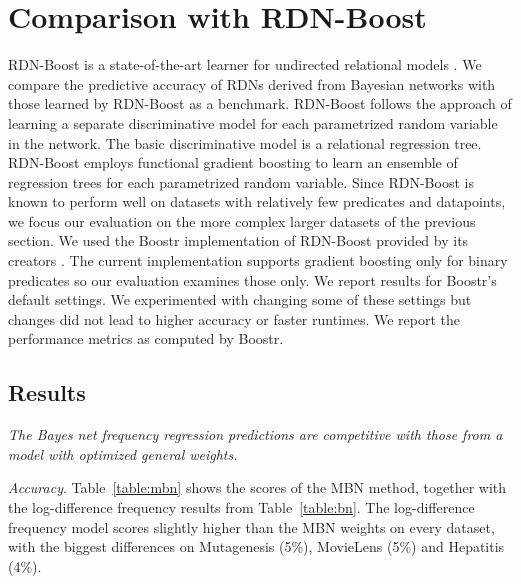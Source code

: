 \documentclass[runningheads,a4paper]{llncs}
\newcommand{\point}[1]{\noindent\emph{#1}.}
\newcommand{\keypoint}[1]{{\em #1}}
\begin{document}
\section{Comparison with RDN-Boost}
\label{sec:general-weights}

RDN-Boost is a state-of-the-art learner for undirected relational models \cite{Natarajan2012}. We compare the predictive accuracy of RDNs derived from Bayesian networks with those learned by RDN-Boost as a benchmark. RDN-Boost follows the approach of learning a separate discriminative model for each  parametrized random variable in the network. The basic discriminative model is a relational regression tree. RDN-Boost employs functional gradient boosting to learn an ensemble of regression trees for each parametrized random variable. Since RDN-Boost is known to perform well on datasets with relatively few predicates and datapoints, we focus our evaluation on the more complex larger datasets of the previous section. We used the Boostr implementation of RDN-Boost provided by its creators \cite{Khot2013}. The current implementation supports gradient boosting only for binary predicates so our evaluation examines those only. We report results for Boostr's default settings. We experimented with changing some of these settings but changes did not lead to higher accuracy or faster runtimes. We report the performance metrics as computed by Boostr. 




\subsection{Results}

\keypoint{The Bayes net frequency regression predictions are competitive with those from a model with optimized general weights.}

\point{Accuracy} Table~\ref{table:mbn} shows the scores of the MBN method, together with the log-difference frequency results from Table~\ref{table:bn}. The log-difference frequency model scores slightly higher than the MBN weights on every dataset, with the biggest differences on Mutagenesis (5\%),  MovieLens (5\%) and Hepatitis (4\%). 
\end{document}

